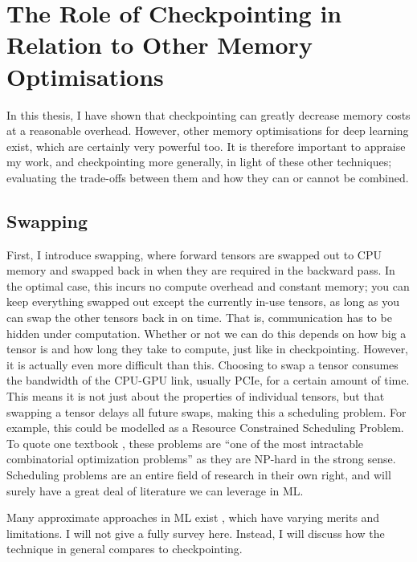 \section{The Role of Checkpointing in Relation to Other Memory Optimisations}
In this thesis, I have shown that checkpointing can greatly decrease memory costs at a reasonable overhead.
However, other memory optimisations for deep learning exist, which are certainly very powerful too.
It is therefore important to appraise my work, and checkpointing more generally, in light of these other techniques; evaluating the trade-offs between them and how they can or cannot be combined.

\subsection{Swapping}
First, I introduce swapping, where forward tensors are swapped out to CPU memory and swapped back in when they are required in the backward pass.
In the optimal case, this incurs no compute overhead and constant memory; you can keep everything swapped out except the currently in-use tensors, as long as you can swap the other tensors back in on time.
That is, communication has to be hidden under computation.
Whether or not we can do this depends on how big a tensor is and how long they take to compute, just like in checkpointing.
However, it is actually even more difficult than this.
Choosing to swap a tensor consumes the bandwidth of the CPU-GPU link, usually PCIe, for a certain amount of time.
This means it is not just about the properties of individual tensors, but that swapping a tensor delays all future swaps, making this a scheduling problem.
For example, this could be modelled as a Resource Constrained Scheduling Problem.
To quote one textbook \cite[p.~23]{Artigues2007-rcps}, these problems are ``one of the most intractable combinatorial optimization problems'' as they are NP-hard in the strong sense.
Scheduling problems are an entire field of research in their own right, and will surely have a great deal of literature we can leverage in ML.

Many approximate approaches in ML exist \cite{Zhang2019, Wang2018, Rhu2016, ShriramS2019, Li2019-mem-limited-devices, Le2018-tflms, Chen2019-modnn, Ito2017-ooc-cudnn, Aupy2016, Schanen2016, Kukreja2018, Aupy2019}, which have varying merits and limitations.
I will not give a fully survey here.
Instead, I will discuss how the technique in general compares to checkpointing.

